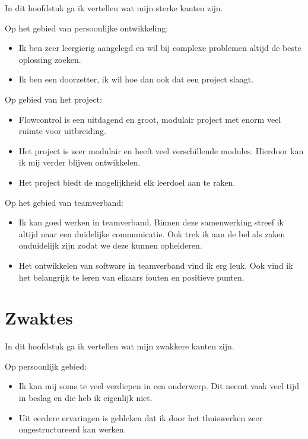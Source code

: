 \documentclass[11pt, twoside]{report}
\begin{document}
    In dit hoofdstuk ga ik vertellen wat mijn sterke kanten zijn.

    Op het gebied van persoonlijke ontwikkeling:
    \begin{itemize}
        \item[] Ik ben zeer leergierig aangelegd en wil bij complexe problemen altijd de beste oplossing zoeken.
        \item[] Ik ben een doorzetter, ik wil hoe dan ook dat een project slaagt.
    \end{itemize}

    Op gebied van het project:
    \begin{itemize}
        \item[] Flowcontrol is een uitdagend en groot, modulair project met enorm veel ruimte voor uitbreiding.
        \item[] Het project is zeer modulair en heeft veel verschillende modules. Hierdoor kan ik mij verder blijven ontwikkelen.
        \item[] Het project biedt de mogelijkheid elk leerdoel aan te raken.
    \end{itemize}

    Op het gebied van teamverband:
    \begin{itemize}
        \item[] Ik kan goed werken in teamverband. Binnen deze samenwerking streef ik altijd naar een duidelijke communicatie. Ook trek ik aan de bel als zaken onduidelijk zijn zodat we deze kunnen ophelderen.
        \item[] Het ontwikkelen van software in teamverband vind ik erg leuk. Ook vind ik het belangrijk te leren van elkaars fouten en positieve punten.
    \end{itemize}

    \section{Zwaktes}\label{sec:zwaktes}
    In dit hoofdstuk ga ik vertellen wat mijn zwakkere kanten zijn.

    Op persoonlijk gebied:
    \begin{itemize}
        \item[] Ik kan mij soms te veel verdiepen in een onderwerp. Dit neemt vaak veel tijd in beslag en die heb ik eigenlijk niet.
        \item[] Uit eerdere ervaringen is gebleken dat ik door het thuiswerken zeer ongestructureerd kan werken.
    \end{itemize}
\end{document}
